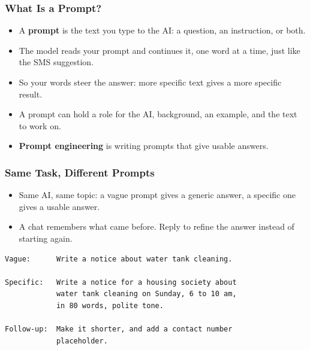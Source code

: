 
\begin{frame}[fragile]\frametitle{What Is a Prompt?}
\begin{itemize}
\item A \textbf{prompt} is the text you type to the AI: a question, an instruction, or both.
\item The model reads your prompt and continues it, one word at a time, just like the SMS suggestion.
\item So your words steer the answer: more specific text gives a more specific result.
\item A prompt can hold a role for the AI, background, an example, and the text to work on.
\item \textbf{Prompt engineering} is writing prompts that give usable answers.
\end{itemize}
\end{frame}

\begin{frame}[fragile]\frametitle{Same Task, Different Prompts}
\begin{itemize}
\item Same AI, same topic: a vague prompt gives a generic answer, a specific one gives a usable answer.
\item A chat remembers what came before. Reply to refine the answer instead of starting again.
\end{itemize}
\begin{lstlisting}[language={}]
Vague:      Write a notice about water tank cleaning.

Specific:   Write a notice for a housing society about
            water tank cleaning on Sunday, 6 to 10 am,
            in 80 words, polite tone.

Follow-up:  Make it shorter, and add a contact number
            placeholder.
\end{lstlisting}
\end{frame}

